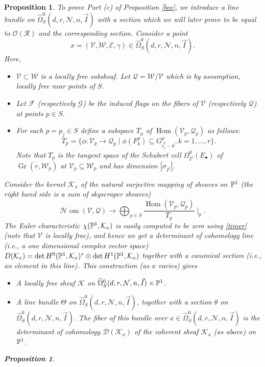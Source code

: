 \documentclass[11pt]{amsart}
\newcommand\bull{{\bullet}}
\newcommand\mk{\mathcal{K}}
\newcommand\me{\mathcal{E}}
\newcommand\mv{\mathcal{V}}
\newcommand\tensor{\otimes}
\newcommand\shom{\mathcal{H}{\operatorname{om}}}
\newcommand\mw{\mathcal{W}}
\newcommand\mq{\mathcal{Q}}
\newcommand\mn{\mathcal{N}}
\newcommand\Hom{\operatorname{Hom}}
\newcommand\Gr{\operatorname{Gr}}
\newtheorem{proposition}[theorem]{Proposition}
\numberwithin{theorem}{subsection}
\begin{document}
{\begin{proposition}
To prove Part (c) of Proposition \ref{bee}, we introduce a line bundle on $\widehat{\Omega}^0_S(d,r,\mn,n,\vec{I})$ with a section which we will later prove to be equal to $\mathcal{O}(\mathcal{R})$ and the corresponding section. Consider a point
$$x=(\mv,\mw,\me,\gamma)\in \widehat{\Omega}^0_S(d,r,\mn,n,\vec{I}).$$
Here,
\begin{itemize}
\item[--]$\mv\subset \mw$ is a locally free subsheaf. Let $\mathcal{Q}=\mw/\mv$ which is by assumption, locally free near points of $S$.
\item[--]Let $\mathcal{F}$ (respectively $\mathcal{G}$) be the induced flags on the fibers of $\mv$ (respectively $\mathcal{Q}$) at points $p\in S$.
\item[--] For each $p=p_j\in S$ define a subspace $T_p$ of $\Hom(\mv_p,\mq_p)$ as follows:
$$T_p=\{\phi: \mv_p\to \mq_p\mid \phi(F^p_{k})\subseteq G^p_{i_j^{k}-k}, k=1,\dots,r \}.$$
Note that $T_p$ is the tangent space of the Schubert cell ${\Omega}^0_{I^j}(E_{\bull})$ of $\Gr(r,\mw_p)$ at $\mv_p\subseteq \mw_p$ and has dimension $|\sigma_{I^j}|$.
\end{itemize}
Consider the kernel $\mk_x$ of the natural surjective mapping of sheaves on $\Bbb{P}^1$  (the right hand side is a sum of skyscraper sheaves)
\begin{equation}\label{sky}
\shom(\mv,\mathcal{Q})\to \bigoplus_{p\in S}\frac{\Hom(\mv_p,\mq_p)}{T_p}\mid_p.
\end{equation}
The Euler characteristic $\chi(\Bbb{P}^1,\mk_x)$ is easily computed to be zero  using \eqref{timer} (note that $\mv$ is locally free), and hence we get a determinant of cohomology line (i.e., a one dimensional complex vector space) $D(\mk_x)=\det H^0(\Bbb{P}^1,\mk_x)^*\tensor  \det H^1(\Bbb{P}^1,\mk_x)$
together with a canonical section (i.e., an element in this line). This construction (as $x$ varies) gives
\begin{itemize}
 \item[-] A locally free sheaf $\mk$ on $\widehat{\Omega}^0_S(d,r,\mn,n,\vec{I})\times\Bbb{P}^1$.
\item[-] A line bundle $\Theta$ on $\widehat{\Omega}^0_S(d,r,\mn,n,\vec{I})$, together with a section $\theta$ on $\widehat{\Omega}^0_S(d,r,\mn,n,\vec{I})$. The fiber of this bundle over $x\in \widehat{\Omega}^0_S(d,r,\mn,n,\vec{I})$ is the determinant of cohomology $\mathcal{D}(\mk_x)$ of the coherent sheaf $\mk_x$ (as above) on $\Bbb{P}^1$.
\end{itemize}
\begin{proposition}\label{torro}

\end{proposition}
\end{proposition}}
\end{document}
